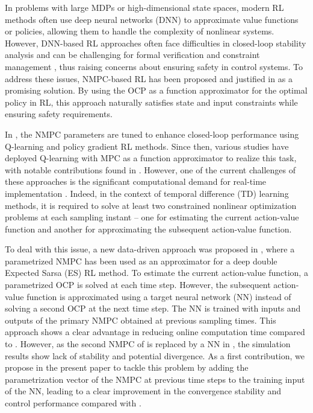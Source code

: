 \documentclass[letterpaper, 10pt, conference]{ieeeconf}
\begin{document}
In problems with large MDPs or high-dimensional state spaces, modern RL methods often use deep neural networks (DNN) to approximate value functions or policies, allowing them to handle the complexity of nonlinear systems.
However, DNN-based RL approaches often face difficulties in closed-loop stability analysis and can be challenging for formal verification and constraint management \cite{gros2019data}, thus raising concerns about ensuring safety in control systems. 
To address these issues, NMPC-based RL has been proposed and justified in \cite{gros2019data} as a promising solution.
By using the OCP as a function approximator for the optimal policy in RL, this approach naturally satisfies state and input constraints while ensuring safety requirements.

In \cite{gros2019data}, the NMPC parameters are tuned to enhance closed-loop performance using Q-learning and policy gradient RL methods. 
Since then, various studies have deployed Q-learning with MPC as a function approximator to realize this task, with notable contributions found in \cite{zanon2019practical,martinsen2020combining,kordabad2021reinforcement,esfahani2021approximate,moradimaryamnegari2022model}.
However, one of the current challenges of these approaches is the significant computational demand for real-time implementation \cite{kordabad2023reinforcement}.
Indeed, in the context of temporal difference (TD) learning methods, it is required to solve at least two constrained nonlinear optimization problems at each sampling instant -- one for estimating the current action-value function and another for approximating the subsequent action-value function.

To deal with this issue, a new data-driven approach was proposed in \cite{moradimaryamnegari2023data}, where a parametrized NMPC has been used as an approximator for a deep double Expected Sarsa (ES) RL method.
To estimate the current action-value function, a parametrized OCP is solved at each time step.
However, the subsequent action-value function is approximated using a target neural network (NN) instead of solving a second OCP at the next time step.
The NN is trained with inputs and outputs of the primary NMPC obtained at previous sampling times.
This approach shows a clear advantage in reducing online computation time compared to \cite{gros2019data}.
However, as the second NMPC of \cite{gros2019data} is replaced by a NN in \cite{moradimaryamnegari2023data}, the simulation results show lack of stability and potential divergence.
As a first contribution, we propose in the present paper to tackle this problem by adding the parametrization vector of the NMPC at previous time steps to the training input of the NN, leading to a clear improvement in the convergence stability and control performance compared with \cite{moradimaryamnegari2023data}.
\end{document}
